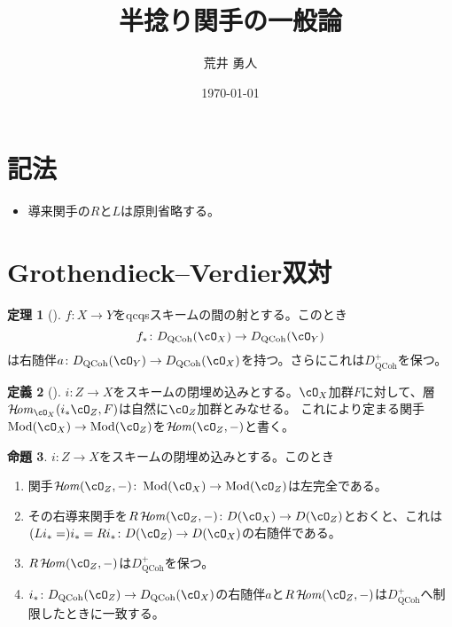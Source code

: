 \documentclass[uplatex, a4paper, dvipdfmx]{jsarticle}
\title{半捻り関手の一般論}
\author{荒井 勇人}
\date{\today}
\theoremstyle{definition}
\newtheorem{theorem}{定理}[section]
\newtheorem{definition}[theorem]{定義}
\newtheorem{proposition}[theorem]{命題}
\DeclareMathOperator{\CHom}{\mathcal{H}\!\mathit{om}}
\DeclareMathOperator{\QCoh}{\mathrm{QCoh}}
\DeclareMathOperator{\Mod}{\mathrm{Mod}}
\begin{document}
\maketitle
\section{記法}
\begin{itemize}
    \item 導来関手の$R$と$L$は原則省略する。
\end{itemize}
\section{Grothendieck--Verdier双対}
\begin{theorem}[{\cite[\href{https://stacks.math.columbia.edu/tag/0A9E}{Tag 0A9E}]{stacks-project}}]
    $f \colon X \to Y$をqcqsスキームの間の射とする。このとき
    \begin{equation}
        f_* \colon D_{\QCoh}(\cO_X) \to D_{\QCoh}(\cO_Y)
    \end{equation}
    は右随伴$a \colon D_{\QCoh}(\cO_Y) \to D_{\QCoh}(\cO_X)$を持つ。さらにこれは$D_{\QCoh}^+$を保つ。
\end{theorem}
\begin{definition}[{\cite[\href{https://stacks.math.columbia.edu/tag/0A74}{Tag 0A74}]{stacks-project}}]
    $i \colon Z \to X$をスキームの閉埋め込みとする。$\cO_X$加群$F$に対して、層$\CHom_{\cO_X}(i_*\cO_Z, F)$は自然に$\cO_Z$加群とみなせる。
    これにより定まる関手$\Mod(\cO_X) \to \Mod(\cO_Z)$を$\CHom(\cO_Z, -)$と書く。
\end{definition}
\begin{proposition}
    $i \colon Z \to X$をスキームの閉埋め込みとする。このとき
    \begin{enumerate}
        \item 関手$\CHom(\cO_Z, -) \colon \Mod(\cO_X) \to \Mod(\cO_Z)$は左完全である。
        \item その右導来関手を$R\CHom(\cO_Z, -) \colon D(\cO_X) \to D(\cO_Z)$とおくと、これは$(L i_* = )i_* = R i_* \colon D(\cO_Z) \to D(\cO_X)$の右随伴である。
        \item $R\CHom(\cO_Z, -)$は$D_{\QCoh}^+$を保つ。
        \item $i_* \colon D_{\QCoh}(\cO_Z) \to D_{\QCoh}(\cO_X)$の右随伴$a$と$R\CHom(\cO_Z, -)$は$D_{\QCoh}^+$へ制限したときに一致する。
    \end{enumerate}
\end{proposition}
\end{document}
